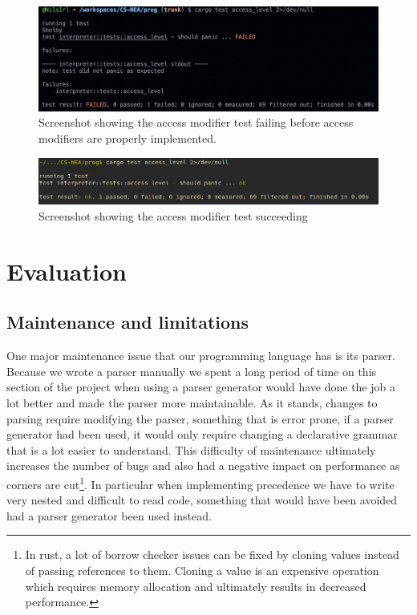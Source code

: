 \documentclass{article}
\begin{document}
\begin{figure}
	\includegraphics[width=\textwidth]{before_access_level}
	\caption{Screenshot showing the access modifier test failing before access
	modifiers are properly implemented.}
	\label{fig:before_access_level}
\end{figure}

\begin{figure}
	\includegraphics[width=\textwidth]{after_access_level}
	\caption{Screenshot showing the access modifier test succeeding}
	\label{fig:after_access_level}
\end{figure}

\section{Evaluation}


\subsection{Maintenance and limitations}

One major maintenance issue that our programming language has is its parser.
Because we wrote a parser manually we spent a long period of time on this
section of the project when using a parser generator would have done the job a
lot better and made the parser more maintainable. As it stands, changes to
parsing require modifying the parser, something that is error prone, if a
parser generator had been used, it would only require changing a declarative
grammar that is a lot easier to understand. This difficulty of maintenance
ultimately increases the number of bugs and also had a negative impact on
performance as corners are cut\footnote{In rust, a lot of borrow checker issues
can be fixed by cloning values instead of passing references to them. Cloning a
value is an expensive operation which requires memory allocation and ultimately
results in decreased performance.}. In particular when implementing
precedence we have to write very nested and difficult to read code, something
that would have been avoided had a parser generator been used instead.
\end{document}
